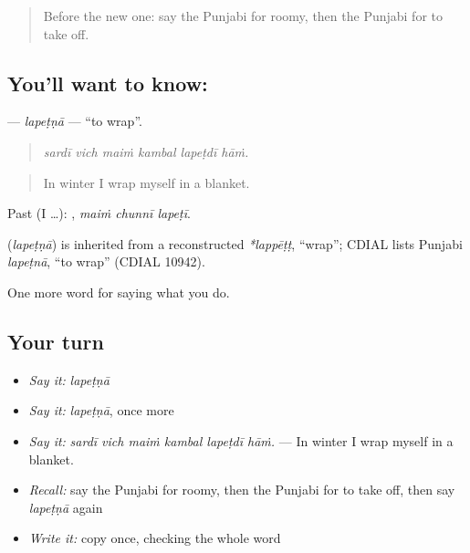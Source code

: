 \begin{quote}
Before the new one: say the Punjabi for roomy, then the Punjabi for to take off.
\end{quote}

\subsection*{You'll want to know: }
\textbf{} — \emph{lapeṭṇā} — \textquotedblleft{}to wrap\textquotedblright{}.

\begin{quote}
     
\end{quote}

\begin{quote}
\emph{sardī vich maiṁ kambal lapeṭdī hāṁ.}
\end{quote}

\begin{quote}
In winter I wrap myself in a blanket.
\end{quote}

Past (I …):   , \emph{maiṁ chunnī lapeṭī}.

\begin{cousinweb}
\textbf{} (\emph{lapeṭṇā}) is inherited from a reconstructed \emph{*lappēṭṭ}, \textquotedblleft{}wrap\textquotedblright{}; CDIAL lists Punjabi \emph{lapeṭnā}, \textquotedblleft{}to wrap\textquotedblright{} (CDIAL 10942).
\end{cousinweb}

\begin{grammarlens}[title={What you've built}]
One more word for saying what you do.
\end{grammarlens}

\subsection*{Your turn}
\begin{itemize}
\raggedright
  \item \emph{Say it:} \emph{lapeṭṇā}
  \item \emph{Say it:} \emph{lapeṭṇā}, once more
  \item \emph{Say it:} \emph{sardī vich maiṁ kambal lapeṭdī hāṁ.} — In winter I wrap myself in a blanket.
  \item \emph{Recall:} say the Punjabi for roomy, then the Punjabi for to take off, then say \emph{lapeṭṇā} again
  \item \emph{Write it:} copy \textbf{} once, checking the whole word
\end{itemize}

